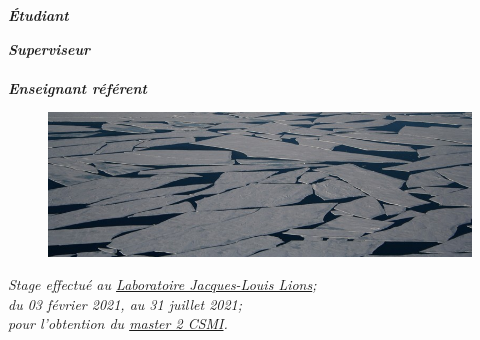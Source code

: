 \documentclass[ 
11pt, %
french, %
singlespacing, %
parskip, %
headsepline, %
openany, %
]{MastersDoctoralThesis} %
\renewcommand{\emph}[1]{\textbf{\textit{#1}}} %
\theoremstyle{plain}
\numberwithin{theorem}{section}  %
\begin{document}
\begin{titlepage}
\begin{center}
\begin{minipage}[t]{0.4\textwidth}
\begin{flushleft} \large
\vspace{7mm}
\emph{Étudiant}\\
\href{https://github.com/desmond-rn}{\authorname} %
\end{flushleft}
\end{minipage}
\begin{minipage}[t]{0.4\textwidth}
\begin{flushright} \large
\emph{Superviseur} \\
\href{https://www-ljk.imag.fr/membres/Stephane.Labbe/}{\supname} %
\\ \vspace{5mm}
\emph{Enseignant référent} \\
\href{http://www.feelpp.org/team/prudhomm/}{\examname} %
\end{flushright}
\end{minipage}%


\begin{figure}[H]
    \centering
    \includegraphics[width=.9\linewidth]{IntroPic2.jpg}
    \label{Fig:IntroPic}
\end{figure}



\large \textit{Stage effectué au \href{https://www.ljll.math.upmc.fr/?lang=fr}{Laboratoire Jacques-Louis Lions};}\\[0.2cm]
\textit{du 03 février 2021, au 31 juillet 2021;}\\[0.2cm]
\textit{pour l'obtention du \href{https://docs.google.com/document/d/10JbbXeqqu5J2BjMkSQRNQ8Gx7xBPOClLKpvd7EBZT8U/edit}{master 2 CSMI}. }\\[0.2cm]


\end{center}
\end{titlepage}
\end{document}
